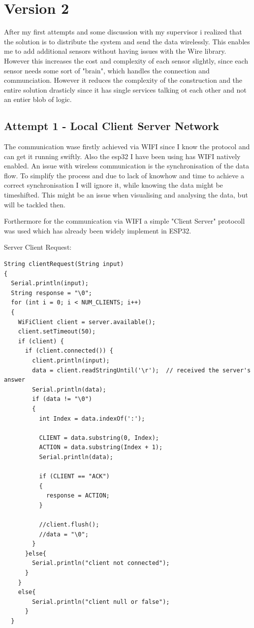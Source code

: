 \chapter*{Version 2}
\label{chap:Technical CHallenges}
\renewcommand{\thesection}{\arabic{section}}
\setcounter{section}{0}

After my first attempts and some discussion with my supervisor i realized that the solution is to distribute the system and send the data wirelessly. This enables me to add additional sensors without having issues with the Wire library. However this increases the cost and complexity of each sensor slightly, since each sensor needs some sort of "brain", which handles the connection and communciation. 
However it reduces the complexity of the construction and the entire solution drasticly since it has single services talking ot each other and not an entier blob of logic. 

\section{Attempt 1 - Local Client Server Network}

The communication wase firstly achieved via WIFI since I know the protocol and can get it running swiftly. Also the esp32 I have been using has WIFI natively enabled. 
An issue with wireless communication is the synchronisation of the data flow. To simplify the process and due to lack of knowhow and time to achieve a correct synchronisation I will ignore it, while knowing the data might be timeshifted. 
This might be an issue when visualising and analysing the data, but will be tackled then.

Forthermore for the communication via WIFI a simple "Client Server" protocoll was used which has already been widely implement in ESP32.

Server Client Request: 
\begin{lstlisting}
String clientRequest(String input)
{
  Serial.println(input);
  String response = "\0";
  for (int i = 0; i < NUM_CLIENTS; i++)
  {
    WiFiClient client = server.available();
    client.setTimeout(50);
    if (client) {
      if (client.connected()) {
        client.println(input);
        data = client.readStringUntil('\r');  // received the server's answer
        Serial.println(data);
        if (data != "\0")
        {
          int Index = data.indexOf(':');
        
          CLIENT = data.substring(0, Index);
          ACTION = data.substring(Index + 1);
          Serial.println(data);
   
          if (CLIENT == "ACK")
          {
            response = ACTION;
          }

          //client.flush();
          //data = "\0";
        }
      }else{
        Serial.println("client not connected");
      }
    }
    else{
        Serial.println("client null or false");
      }
  }
\end{lstlisting}

